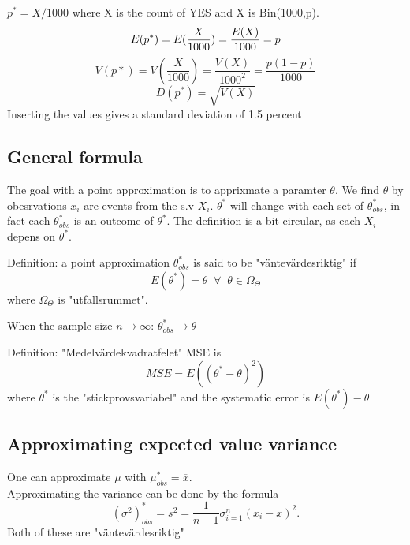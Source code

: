 \documentclass{article}
\begin{document}
        $p^* = X/1000$ where X is the count of YES and X is Bin(1000,p).
        \[
            E(p^*) = E(\frac{X}{1000}) = \frac{E(X)}{1000} = p \\
        \]
        \[
            V(p*) = V(\frac{X}{1000}) = \frac{V(X)}{1000^2} = 
            \frac{p(1-p)}{1000}
        \]
        \[
            D(p^*) = \sqrt{V(X)}
        \]
        Inserting the values gives a standard deviation of 1.5 percent
    \subsection{General formula}
        The goal with a point approximation is to apprixmate a paramter $\theta$. 
        We find $\theta$ by obesrvations $x_i$ are events from the s.v $X_i$. 
        $\theta^*$ will change with each set of $\theta_{obs}^*$, in fact
        each $\theta_{obs}^*$ is an outcome of $\theta^*$. The definition is a bit
        circular, as each $X_i$ depens on $\theta^*$. 

        \begin{tcolorbox}

            Definition: a point approximation $\theta_{obs}^*$ is said to be
            "väntevärdesriktig" if 
            \[
                E(\theta^*) = \theta \;\;\forall \;\;\theta \in \Omega_{\Theta}
            \]
            where $\Omega_{\Theta}$ is "utfallsrummet". 

        \end{tcolorbox}
        When the sample size $n \to \infty$:  $\theta_{obs}^* \to \theta$
        \begin{tcolorbox}

            Definition: "Medelvärdekvadratfelet" MSE is
            \[
                MSE = E((\theta^* - \theta)^2)
            \]
            where $\theta^*$ is the "stickprovsvariabel" and the systematic
            error is    $E(\theta^*) - \theta$


        \end{tcolorbox}
    \subsection{Approximating expected value variance}
        One can approximate $\mu$ with $\mu_{obs}^* = \overline{x}.$\\
        Approximating the variance can be done by the formula
        \[
            (\sigma^2)_{obs}^* = s^2 = \frac{1}{n-1} \sigma_{i=1}^n (x_i - \overline{x})^2.  
        \]
        Both of these are "väntevärdesriktig"
\end{document}

